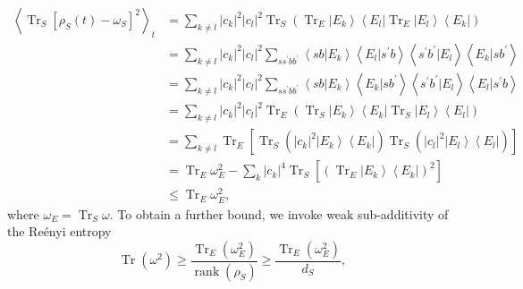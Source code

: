 \begin{equation}
\begin{aligned}
\left\langle\operatorname{Tr}_{S}\left[\rho_{S}(t)-\omega_{S}\right]^{2}\right\rangle_{t} &=\sum_{k \neq l}\left|c_{k}\right|^{2}\left|c_{l}\right|^{2} \operatorname{Tr}_{S}\left(\operatorname{Tr}_{E}\left|E_{k}\right\rangle\left\langle E_{l}\left|\operatorname{Tr}_{E}\right| E_{l}\right\rangle\left\langle E_{k}\right|\right) \\
&=\sum_{k \neq l}\left|c_{k}\right|^{2}\left|c_{l}\right|^{2} \sum_{s s^{\prime} b b^{\prime}}\left\langle s b | E_{k}\right\rangle\left\langle E_{l} | s^{\prime} b\right\rangle\left\langle s^{\prime} b^{\prime} | E_{l}\right\rangle\left\langle E_{k} | s b^{\prime}\right\rangle\\
&=\sum_{k \neq l}\left|c_{k}\right|^{2}\left|c_{l}\right|^{2} \sum_{s s^{\prime} b b^{\prime}}\left\langle s b | E_{k}\right\rangle\left\langle E_{k} | s b^{\prime}\right\rangle\left\langle s^{\prime} b^{\prime} | E_{l}\right\rangle\left\langle E_{l} | s^{\prime} b\right\rangle \\
&=\sum_{k \neq l}\left|c_{k}\right|^{2}\left|c_{l}\right|^{2} \operatorname{Tr}_{E}\left(\operatorname{Tr}_{S}\left|E_{k}\right\rangle\left\langle E_{k}\left|\operatorname{Tr}_{S}\right| E_{l}\right\rangle\left\langle E_{l}\right|\right)\\
&=\sum_{k \neq l} \operatorname{Tr}_{E}\left[\operatorname{Tr}_{S}\left(\left|c_{k}\right|^{2}\left|E_{k}\right\rangle\left\langle E_{k}\right|\right) \operatorname{Tr}_{S}\left(\left|c_{l}\right|^{2}\left|E_{l}\right\rangle\left\langle E_{l}\right|\right)\right] \\
&=\operatorname{Tr}_{E} \omega_{E}^{2}-\sum_{k}\left|c_{k}\right|^{4} \operatorname{Tr}_{S}\left[\left(\operatorname{Tr}_{E}\left|E_{k}\right\rangle\left\langle E_{k}\right|\right)^{2}\right] \\
&\leq \operatorname{Tr}_{E} \omega_{E}^{2},
\end{aligned}
\label{CH1:Linden_proof_3}
\end{equation}
where $\omega_E=\operatorname{Tr}_S \omega$. To obtain a further bound, we invoke weak
sub-additivity of the Re\'enyi entropy \cite{camilo_strong_2019}
\begin{equation}
\operatorname{Tr}\left(\omega^{2}\right) \geq \frac{\operatorname{Tr}_{E}\left(\omega_{E}^{2}\right)}{\operatorname{rank}\left(\rho_{S}\right)} \geq \frac{\operatorname{Tr}_{E}\left(\omega_{E}^{2}\right)}{d_{S}},
\label{CH1:Linden_proof_4}
\end{equation}

